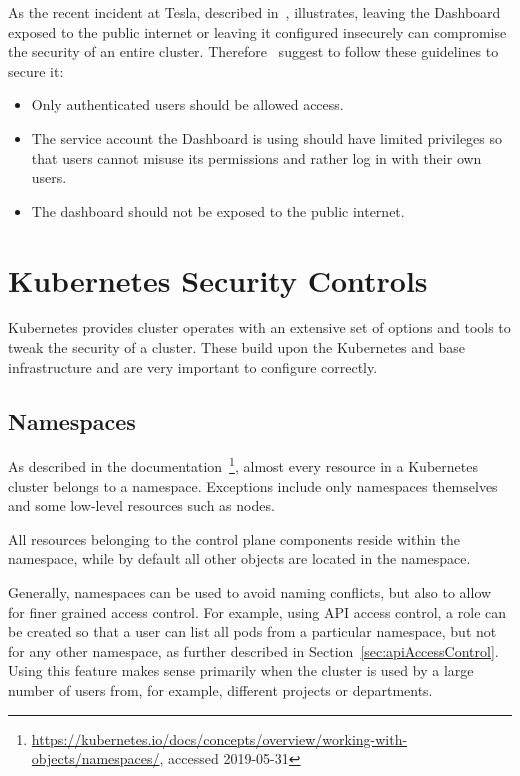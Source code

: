 As the recent incident at Tesla, described in~\textcite{teslaLeak}, illustrates, leaving the Dashboard exposed to the public internet or leaving it configured insecurely can compromise the security of an entire cluster. Therefore~\textcite{kubernetessecurity} suggest to follow these guidelines to secure it:

\begin{itemize}
    \item Only authenticated users should be allowed access.
    \item The service account the Dashboard is using should have limited privileges so that users cannot misuse its permissions and rather log in with their own users.
    \item The dashboard should not be exposed to the public internet.
\end{itemize}

\section{Kubernetes Security Controls} \label{sec:layer3}

Kubernetes provides cluster operates with an extensive set of options and tools to tweak the security of a cluster. These build upon the Kubernetes and base infrastructure and are very important to configure correctly. 

\subsection{Namespaces} \label{sec:namespaces}

As described in the documentation~\textcite{k8sdocs}\footnote{\url{https://kubernetes.io/docs/concepts/overview/working-with-objects/namespaces/}, accessed 2019-05-31}, almost every resource in a Kubernetes cluster belongs to a namespace. Exceptions include only namespaces themselves and some low-level resources such as nodes. 

All resources belonging to the control plane components reside within the  namespace, while by default all other objects are located in the  namespace. 

Generally, namespaces can be used to avoid naming conflicts, but also to allow for finer grained access control. For example, using API access control, a role can be created so that a user can list all pods from a particular namespace, but not for any other namespace, as further described in Section~\ref{sec:apiAccessControl}. Using this feature makes sense primarily when the cluster is used by a large number of users from, for example, different projects or departments. 

